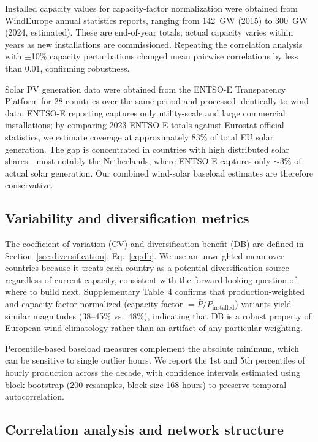 \documentclass[sn-nature]{sn-jnl}%
\begin{document}
Installed capacity values for capacity-factor normalization were obtained from WindEurope annual statistics reports, ranging from 142~GW (2015) to 300~GW (2024, estimated). These are end-of-year totals; actual capacity varies within years as new installations are commissioned. Repeating the correlation analysis with $\pm$10\% capacity perturbations changed mean pairwise correlations by less than 0.01, confirming robustness.

Solar PV generation data were obtained from the ENTSO-E Transparency Platform for 28 countries over the same period and processed identically to wind data. ENTSO-E reporting captures only utility-scale and large commercial installations; by comparing 2023 ENTSO-E totals against Eurostat official statistics, we estimate coverage at approximately 83\% of total EU solar generation. The gap is concentrated in countries with high distributed solar shares---most notably the Netherlands, where ENTSO-E captures only $\sim$3\% of actual solar generation. Our combined wind-solar baseload estimates are therefore conservative.

\subsection{Variability and diversification metrics}

The coefficient of variation (CV) and diversification benefit (DB) are defined in Section~\ref{sec:diversification}, Eq.~\ref{eq:db}. We use an unweighted mean over countries because it treats each country as a potential diversification source regardless of current capacity, consistent with the forward-looking question of where to build next. Supplementary Table~4 confirms that production-weighted and capacity-factor-normalized (capacity factor $= \bar{P}/P_{\text{installed}}$) variants yield similar magnitudes (38--45\% vs.\ 48\%), indicating that DB is a robust property of European wind climatology rather than an artifact of any particular weighting.

Percentile-based baseload measures complement the absolute minimum, which can be sensitive to single outlier hours. We report the 1st and 5th percentiles of hourly production across the decade, with confidence intervals estimated using block bootstrap (200 resamples, block size 168 hours) to preserve temporal autocorrelation.

\subsection{Correlation analysis and network structure}
\end{document}
